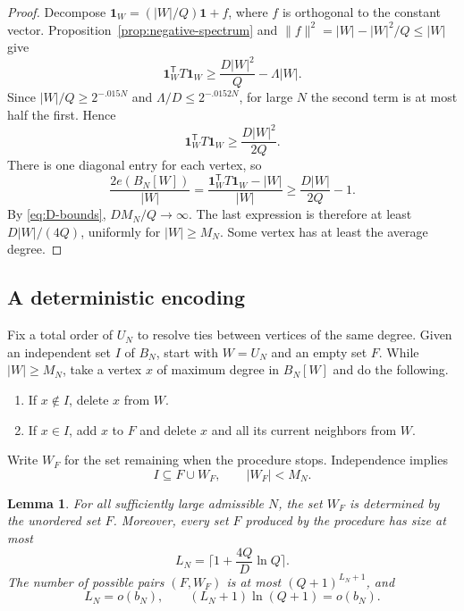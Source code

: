 \documentclass[11pt,leqno]{amsart}
\numberwithin{equation}{section}
\newtheorem{lemma}[theorem]{Lemma}
\theoremstyle{definition}
\theoremstyle{remark}
\newcommand{\one}{\mathbf 1}
\newcommand{\abs}[1]{\lvert#1\rvert}
\newcommand{\norm}[1]{\lVert#1\rVert}
\newcommand{\ceil}[1]{\lceil#1\rceil}
\begin{document}
\begin{proof}
Decompose $\one_W=(\abs W/Q)\one+f$, where $f$ is orthogonal to the constant vector. Proposition~\ref{prop:negative-spectrum} and $\norm f^2=\abs W-\abs W^2/Q\le\abs W$ give
\[
 \one_W^{\mathsf T}T\one_W
 \ge \frac{D\abs W^2}{Q}-\Lambda\abs W.
\]
Since $\abs W/Q\ge2^{-.015N}$ and $\Lambda/D\le2^{-.0152N}$, for large $N$ the second term is at most half the first. Hence
\[
 \one_W^{\mathsf T}T\one_W\ge\frac{D\abs W^2}{2Q}.
\]
There is one diagonal entry for each vertex, so
\[
 \frac{2e(B_N[W])}{\abs W}
 =\frac{\one_W^{\mathsf T}T\one_W-\abs W}{\abs W}
 \ge\frac{D\abs W}{2Q}-1.
\]
By \eqref{eq:D-bounds}, $DM_N/Q\to\infty$. The last expression is therefore at least $D\abs W/(4Q)$, uniformly for $\abs W\ge M_N$. Some vertex has at least the average degree.
\end{proof}

\subsection{A deterministic encoding}

Fix a total order of $U_N$ to resolve ties between vertices of the same degree. Given an independent set $I$ of $B_N$, start with $W=U_N$ and an empty set $F$. While $\abs W\ge M_N$, take a vertex $x$ of maximum degree in $B_N[W]$ and do the following.
\begin{enumerate}
 \item If $x\notin I$, delete $x$ from $W$.
 \item If $x\in I$, add $x$ to $F$ and delete $x$ and all its current neighbors from $W$.
\end{enumerate}
Write $W_F$ for the set remaining when the procedure stops. Independence implies
\begin{equation}\label{eq:container-cover}
 I\subseteq F\cup W_F,\qquad \abs{W_F}<M_N.
\end{equation}

\begin{lemma}\label{lem:fingerprints}
For all sufficiently large admissible $N$, the set $W_F$ is determined by the unordered set $F$. Moreover, every set $F$ produced by the procedure has size at most
\begin{equation}\label{eq:fingerprint-size}
 L_N=\ceil{1+\frac{4Q}{D}\ln Q}.
\end{equation}
The number of possible pairs $(F,W_F)$ is at most $(Q+1)^{L_N+1}$, and
\begin{equation}\label{eq:fingerprint-negligible}
 L_N=o(b_N),\qquad (L_N+1)\ln(Q+1)=o(b_N).
\end{equation}
\end{lemma}
\end{document}
